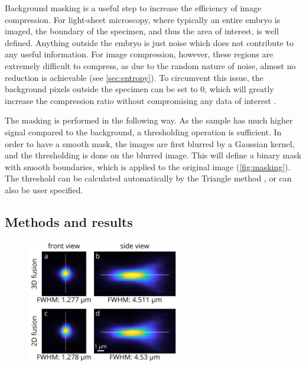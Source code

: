   Background masking is a useful step to increase the efficiency of image compression. For light-sheet microscopy, where typically an entire embryo is imaged, the boundary of the specimen, and thus the area of interest, is well defined. Anything outside the embryo is just noise which does not contribute to any useful information. For image compression, however, these regions are extremely difficult to compress, as due to the random nature of noise, almost no reduction is achievable (see \ref{sec:entropy}). To circumvent this issue, the background pixels outside the specimen can be set to 0, which will greatly increase the compression ratio without compromising any data of interest \cite{amat_efficient_2015}.

  The masking is performed in the following way. As the sample has much higher signal compared to the background, a thresholding operation is sufficient. In order to have a smooth mask, the images are first blurred by a Gaussian kernel, and the thresholding is done on the blurred image. This will define a binary mask with smooth boundaries, which is applied to the original image (\autoref{fig:masking}). The threshold can be calculated automatically by the Triangle method \cite{zack_automatic_1977}, or can also be user specified.

  

  


\subsection{Methods and results}


\begin{figure}
  \centering
  \includegraphics[width=0.6\textwidth]{fusion/beads/2Dvs3Dbeads}
  \label{fig:2Dvs3Dbeads}
\end{figure}

